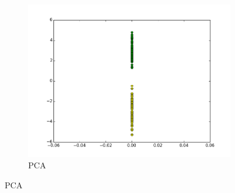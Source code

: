 \documentclass[a4paper,12pt]{article}    %
\begin{document}
\begin{figure}[!ht]
\begin{subfigure}{.45\textwidth}
		\includegraphics[width=\linewidth]{img/6pca.png}
		\caption{PCA}
	\end{subfigure}
	\label{dataset2}
\end{figure}
\vfill
\clearpage
\end{document}

